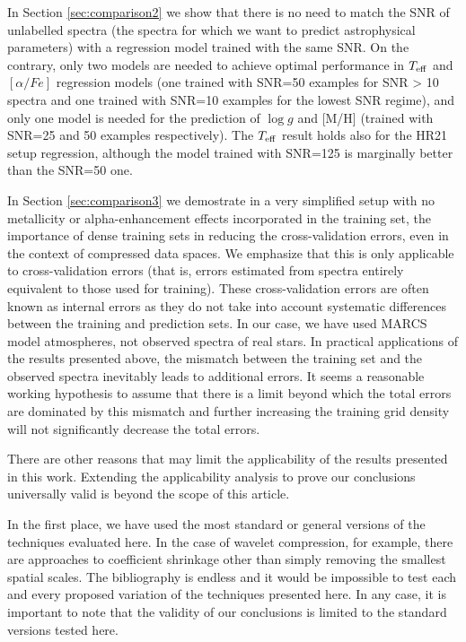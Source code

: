 \documentclass[a4paper,fleqn,usenatbib]{mnras}
\begin{document}
{{{In Section \ref{sec:comparison2} we show that there is no need to match 
the SNR of unlabelled spectra (the spectra for which we want to predict 
astrophysical parameters) with a regression model trained with the same SNR. 
On the contrary, only two models are needed to achieve optimal performance 
in $T_{\rm eff}$ and $\left[ \alpha/Fe \right]$ regression models (one trained 
with SNR=50 examples for SNR > 10 spectra and one trained with SNR=10 examples 
for the lowest SNR regime), and only one model is needed for the prediction 
of $\log g$ and [M/H] (trained with SNR=25 and 50 examples respectively). 
The $T_{\rm eff}$ result holds also for the HR21 setup regression, although the  
model trained with SNR=125 is marginally better than the SNR=50 one.

In Section \ref{sec:comparison3} we demostrate in a very simplified setup with 
no metallicity or alpha-enhancement effects incorporated in the training set,
the importance of dense training sets in reducing the cross-validation errors, 
even in the context of compressed data spaces. We emphasize that this is only 
applicable to cross-validation errors (that is, errors estimated from spectra 
entirely equivalent to those used for training). These cross-validation errors 
are often known as internal errors as they do not take into account systematic 
differences between the training and prediction sets. In our case, we have used 
MARCS model atmospheres, not observed spectra of real stars. In practical 
applications of the results presented above, the mismatch between the training 
set and the observed spectra inevitably leads to additional errors.
It seems a reasonable working hypothesis to assume that there is a limit beyond 
which the total errors are dominated by this mismatch and further increasing the 
training grid density will not significantly decrease the total errors.  
 
There are other reasons that may limit the applicability of the results 
presented in this work. Extending the applicability analysis to prove our 
conclusions universally valid is beyond the scope of this article.

In the first place, we have used the most standard or general versions of 
the techniques evaluated here. In the case of wavelet compression, for example, 
there are approaches to coefficient shrinkage other than simply removing 
the smallest spatial scales. The bibliography is endless and it would be 
impossible to test each and every proposed variation of the techniques 
presented here. In any case, it is important to note that the validity of 
our conclusions is limited to the standard versions tested here. 

}}}
\end{document}

